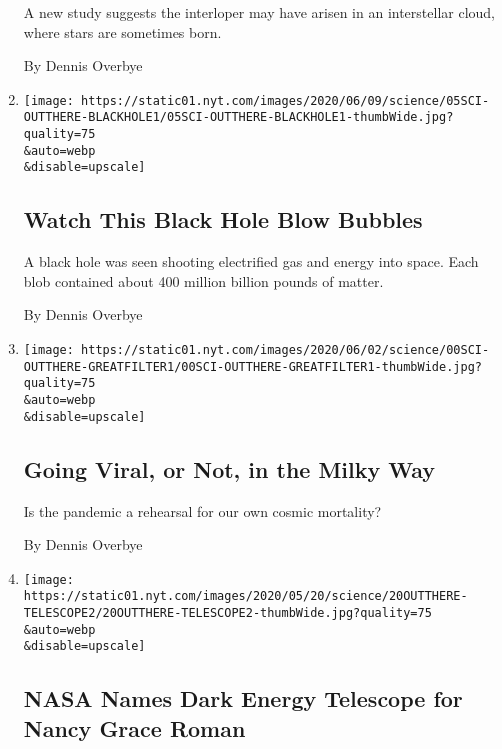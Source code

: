 \begin{enumerate}
  A new study suggests the interloper may have arisen in an interstellar
  cloud, where stars are sometimes born.

  By Dennis Overbye
\item
  \href{/2020/06/05/science/black-hole-astronomy.html}{}

  \texttt{[image: https://static01.nyt.com/images/2020/06/09/science/05SCI-OUTTHERE-BLACKHOLE1/05SCI-OUTTHERE-BLACKHOLE1-thumbWide.jpg?quality=75\\\&auto=webp\\\&disable=upscale]}

  \hypertarget{watch-this-black-hole-blow-bubbles}{%
  \subsection{Watch This Black Hole Blow
  Bubbles}\label{watch-this-black-hole-blow-bubbles}}

  A black hole was seen shooting electrified gas and energy into space.
  Each blob contained about 400 million billion pounds of matter.

  By Dennis Overbye
\item
  \href{/2020/06/02/science/coronavirus-space-travel-colonization.html}{}

  \texttt{[image: https://static01.nyt.com/images/2020/06/02/science/00SCI-OUTTHERE-GREATFILTER1/00SCI-OUTTHERE-GREATFILTER1-thumbWide.jpg?quality=75\\\&auto=webp\\\&disable=upscale]}

  \hypertarget{going-viral-or-not-in-the-milky-way}{%
  \subsection{Going Viral, or Not, in the Milky
  Way}\label{going-viral-or-not-in-the-milky-way}}

  Is the pandemic a rehearsal for our own cosmic mortality?

  By Dennis Overbye
\item
  \href{/2020/05/20/science/nancy-grace-roman-telescope.html}{}

  \texttt{[image: https://static01.nyt.com/images/2020/05/20/science/20OUTTHERE-TELESCOPE2/20OUTTHERE-TELESCOPE2-thumbWide.jpg?quality=75\\\&auto=webp\\\&disable=upscale]}

  \hypertarget{nasa-names-dark-energy-telescope-for-nancy-grace-roman}{%
  \subsection{NASA Names Dark Energy Telescope for Nancy Grace
  Roman}\label{nasa-names-dark-energy-telescope-for-nancy-grace-roman}}


\end{enumerate}
